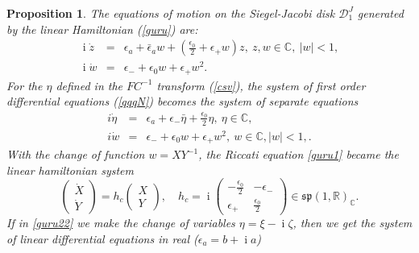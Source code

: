 \documentclass[12pt]{amsart}
\numberwithin{equation}{section}
\newtheorem{Proposition}{Proposition}
\theoremstyle{definition}
\begin{document}
\begin{Proposition}\label{EQLIN1}
The equations of motion on the Siegel-Jacobi disk $\mathcal{D}^J_1$
 generated by
the linear Hamiltonian {\em(\ref{guru})}
 are:
\begin{subequations}\label{qqqN}
\begin{eqnarray}
{\operatorname{i}}\dot{z} & = & \epsilon_a+{\bar{\epsilon}}_a w+(\frac{\epsilon_0}{2}
+\epsilon_+  w )z,~z,w\in{\ensuremath{\mathbb{C}}}, ~|w|<1, \label{guru2}\\
{\operatorname{i}}\dot{w} & = & \epsilon_- + \epsilon_0w+
\epsilon_+w^2 .\label{guru1}
\end{eqnarray}
\end{subequations}
 For the $\eta$ defined in the $FC^{-1}$ transform \emph{(\ref{csv})}, the
 system of first order differential  equations \emph{(\ref{qqqN})} becomes  the
system of separate equations 
\begin{subequations}\label{qqqN1}
\begin{eqnarray}
i\dot{\eta} & = & \epsilon_a
+\epsilon_-\bar{\eta}+\frac{\epsilon_0}{2}\eta,~\eta \in{\ensuremath{\mathbb{C}}},\label{guru22}\\
i\dot{w} & = & \epsilon_- + \epsilon_0w+
\epsilon_+w^2,~ w\in{\ensuremath{\mathbb{C}}},|w|<1, .\label{guru12}
\end{eqnarray}
\end{subequations}
With the change of function $w=XY^{-1}$, the Riccati equation
\eqref{guru1} became the linear hamiltonian system
\begin{equation}\label{GURRU11}
\left(\begin{array}{c}\dot{X} \\ \dot{Y}\end{array}\right)=h_c
\left(\begin{array}{c}X \\ Y\end{array}\right),\quad h_c={\operatorname{i}} 
\left(\begin{array}{cc} -\frac{\epsilon_0}{2} & -\epsilon_-\\
    \epsilon_+  & 
    \frac{\epsilon_0}{2} \end{array}\right) \in {{\mathfrak{{sp}}}}(1,{\ensuremath{\mathbb{R}}})_{\ensuremath{\mathbb{C}}}. 
\end{equation}
If in \eqref{guru22} we make the change of variables $\eta=\xi-{\operatorname{i}}
\zeta$, then we  get the system of linear differential equations in real
($\epsilon_a=b+{\operatorname{i}} a$)
\begin{equation}\label{GURRU12}

\end{equation}
\end{Proposition}
\end{document}
